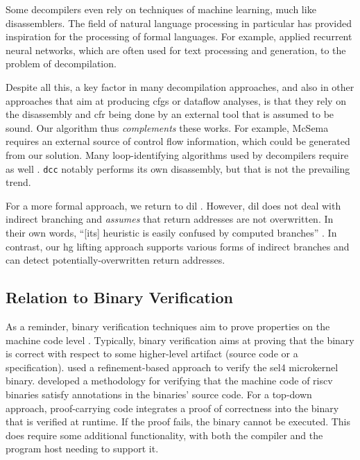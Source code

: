 Some decompilers even rely on techniques of machine learning, much like disassemblers.
The field of natural language processing in particular has provided inspiration for the processing of formal languages.
For example, \textcite{katz2018recurrent} applied recurrent neural networks, which are often used for text processing and generation, to the problem of decompilation.

Despite all this, a key factor in many decompilation approaches, and also in other approaches that aim at producing \glspl{cfg} or dataflow analyses, is that they rely on the disassembly and \gls{cfr} being done by an external tool that is assumed to be sound.
Our algorithm thus \emph{complements} these works.
For example, McSema requires an external source of control flow information, which could be generated from our solution.
Many loop-identifying algorithms used by decompilers require  as well \autocite{hecht1974reducible,wei2007loops}.
\lstinline|dcc| notably performs its own disassembly, but that is not the prevailing trend.

For a more formal approach, we return to \gls{dil} \autocite{myreen2007hoare,myreen2012dil}.
However, \gls{dil} does not deal with indirect branching and \emph{assumes} that return addresses are not overwritten.
In their own words, ``[its] heuristic is easily confused by computed branches'' \autocite{myreen2008dil}.
In contrast, our \gls{hg} lifting approach supports various forms of indirect branches and can detect potentially-overwritten return addresses.

\subsection{Relation to Binary Verification}\label{related-hg-verification}
As a reminder, binary verification techniques aim to prove properties on the machine code level \autocite{kumar2018software}.
Typically, binary verification aims at proving that the binary is correct with respect to some higher-level artifact (source code or a specification).
\Textcite{klein2009sel4,klein2010refinement,sewell2013tvv} used a refinement-based approach to verify the \gls{sel4} microkernel binary.
\Textcite{kamkin2020deductive} developed a methodology for verifying that the machine code of \gls{riscv} binaries satisfy annotations in the binaries' source code.
For a top-down approach, proof-carrying code \autocite{necula1997proof}
integrates a proof of correctness into the binary that is verified at runtime.
If the proof fails, the binary cannot be executed.
This does require some additional functionality, with both the compiler and the program host needing to support it.

